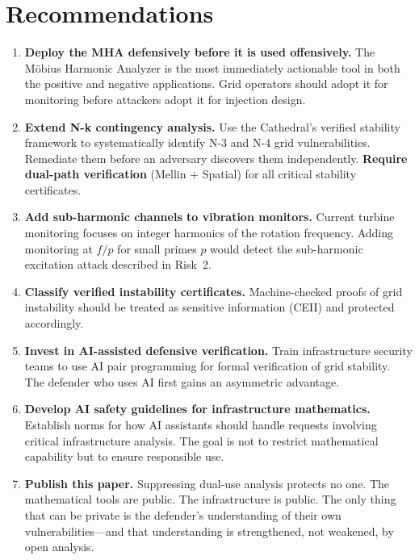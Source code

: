 \documentclass[11pt,a4paper]{article}
\begin{document}
\section{Recommendations}

\begin{enumerate}
  \item \textbf{Deploy the MHA defensively before it is used
    offensively.} The M\"obius Harmonic Analyzer is the most
    immediately actionable tool in both the positive and negative
    applications. Grid operators should adopt it for monitoring
    before attackers adopt it for injection design.

  \item \textbf{Extend N-k contingency analysis.} Use the Cathedral's
    verified stability framework to systematically identify N-3 and
    N-4 grid vulnerabilities. Remediate them before an adversary
    discovers them independently. \textbf{Require dual-path
    verification} (Mellin + Spatial) for all critical stability
    certificates.

  \item \textbf{Add sub-harmonic channels to vibration monitors.}
    Current turbine monitoring focuses on integer harmonics of the
    rotation frequency. Adding monitoring at $f/p$ for small primes
    $p$ would detect the sub-harmonic excitation attack described
    in Risk~2.

  \item \textbf{Classify verified instability certificates.}
    Machine-checked proofs of grid instability should be treated
    as sensitive information (CEII) and protected accordingly.

  \item \textbf{Invest in AI-assisted defensive verification.}
    Train infrastructure security teams to use AI pair programming
    for formal verification of grid stability. The defender who
    uses AI first gains an asymmetric advantage.

  \item \textbf{Develop AI safety guidelines for infrastructure
    mathematics.} Establish norms for how AI assistants should
    handle requests involving critical infrastructure analysis.
    The goal is not to restrict mathematical capability but to
    ensure responsible use.

  \item \textbf{Publish this paper.} Suppressing dual-use analysis
    protects no one. The mathematical tools are public. The
    infrastructure is public. The only thing that can be private is
    the defender's understanding of their own vulnerabilities---and
    that understanding is strengthened, not weakened, by open
    analysis.
\end{enumerate}
\end{document}
